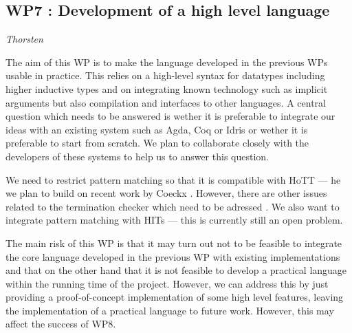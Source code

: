 \documentclass[twocolumn,a4paper,11pt]{article}
\begin{document}





  

\subsection*{WP7 : Development of a high level language} 

\emph{Thorsten}

The aim of this WP is to make the language developed in the previous
WPs usable in practice. This relies on a high-level syntax for
datatypes including higher inductive types and on integrating known
technology such as implicit arguments but also compilation and
interfaces to other languages. A central question which needs to be
answered is wether it is preferable to integrate our ideas with an
existing system such as Agda, Coq or Idris or wether it is preferable
to start from scratch. We plan to collaborate closely with the
developers of these systems to help us to answer this question.

We need to restrict pattern matching so that it is compatible with
HoTT --- he we plan to build on recent work by Coeckx
\cite{coeckx-without-k}. However, there are other issues related to
the termination checker which need to be adressed
\cite{coq-agda-issue-w-termination}. We also want to integrate
pattern matching with HITs --- this is currently still an open problem.

The main risk of this WP is that it may turn out not to be feasible to
integrate the core language developed in the previous WP with existing
implementations and that on the other hand that it is not feasible to
develop a practical language within the running time of the
project. However, we can address this by just providing a
proof-of-concept implementation of some high level features, leaving
the implementation of a practical language to future work. However,
this may affect the success of WP8.
\end{document}
